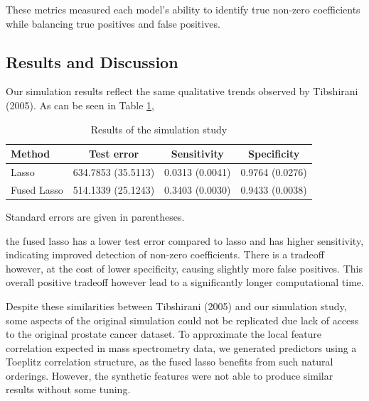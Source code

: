 \documentclass[12pt]{article}
\begin{document}
These metrics measured each model's ability to identify true non-zero coefficients while balancing true positives and false positives.

\subsection{Results and Discussion}

Our simulation results reflect the same qualitative trends observed by Tibshirani (2005). As can be seen in Table \ref{tab:simulation_results},

\begin{table}[H]
\centering
    \begin{threeparttable}
        \caption{Results of the simulation study\tnote{\dag}}
        \label{tab:simulation_results}
        \begin{tabular}{lccc}
            \toprule
            \textbf{Method} & \textbf{Test error} & \textbf{Sensitivity} & \textbf{Specificity} \\
            \midrule
            Lasso & 634.7853 (35.5113) & 0.0313 (0.0041) & 0.9764 (0.0276) \\
            Fused Lasso & 514.1339 (25.1243) & 0.3403 (0.0030) & 0.9433 (0.0038) \\
            \bottomrule
            \end{tabular}
        \begin{tablenotes}
            \item[\dag] Standard errors are given in parentheses.
        \end{tablenotes}
    \end{threeparttable}
\end{table}

\noindent the fused lasso has a lower test error compared to lasso and has higher sensitivity, indicating improved detection of non-zero coefficients. There is a tradeoff however, at the cost of lower specificity, causing slightly more false positives. This overall positive tradeoff however lead to a significantly longer computational time.  

Despite these similarities between Tibshirani (2005) and our simulation study, some aspects of the original simulation could not be replicated due lack of access to the original prostate cancer dataset. To approximate the local feature correlation expected in mass spectrometry data, we generated predictors using a Toeplitz correlation structure, as the fused lasso benefits from such natural orderings. However, the synthetic features were not able to produce similar results without some tuning.
\end{document}
